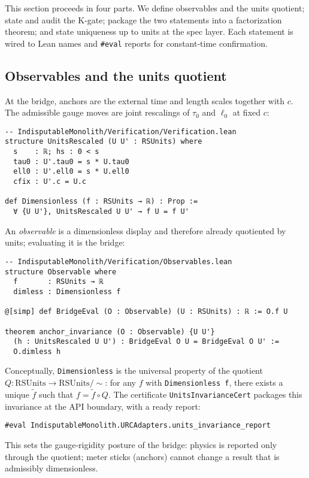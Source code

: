 \documentclass[11pt,a4paper,twoside]{article}
\numberwithin{equation}{section}
\theoremstyle{customthm}
\theoremstyle{customdef}
\theoremstyle{customrem}
\begin{document}
This section proceeds in four parts. We define observables and the units quotient; state and audit the K‐gate; package the two statements into a factorization theorem; and state uniqueness up to units at the spec layer. Each statement is wired to Lean names and \texttt{\#eval} reports for constant‐time confirmation.

\subsection{Observables and the units quotient}

At the bridge, anchors are the external time and length scales together with \(c\). The admissible gauge moves are joint rescalings of \(\tau_0\) and \(\ell_0\) at fixed \(c\):
\begin{lstlisting}
-- IndisputableMonolith/Verification/Verification.lean
structure UnitsRescaled (U U' : RSUnits) where
  s    : ℝ; hs : 0 < s
  tau0 : U'.tau0 = s * U.tau0
  ell0 : U'.ell0 = s * U.ell0
  cfix : U'.c = U.c

def Dimensionless (f : RSUnits → ℝ) : Prop :=
  ∀ {U U'}, UnitsRescaled U U' → f U = f U'
\end{lstlisting}

An \emph{observable} is a dimensionless display and therefore already quotiented by units; evaluating it is the bridge:
\begin{lstlisting}
-- IndisputableMonolith/Verification/Observables.lean
structure Observable where
  f       : RSUnits → ℝ
  dimless : Dimensionless f

@[simp] def BridgeEval (O : Observable) (U : RSUnits) : ℝ := O.f U

theorem anchor_invariance (O : Observable) {U U'}
  (h : UnitsRescaled U U') : BridgeEval O U = BridgeEval O U' :=
  O.dimless h
\end{lstlisting}

Conceptually, \texttt{Dimensionless} is the universal property of the quotient \(Q : \mathrm{RSUnits} \to \mathrm{RSUnits}/{\sim}\): for any \(f\) with \texttt{Dimensionless f}, there exists a unique \(\tilde f\) such that \(f = \tilde f \circ Q\). The certificate \texttt{UnitsInvarianceCert} packages this invariance at the API boundary, with a ready report:
\begin{lstlisting}
#eval IndisputableMonolith.URCAdapters.units_invariance_report
\end{lstlisting}

This sets the gauge‐rigidity posture of the bridge: physics is reported only through the quotient; meter sticks (anchors) cannot change a result that is admissibly dimensionless.
\end{document}
